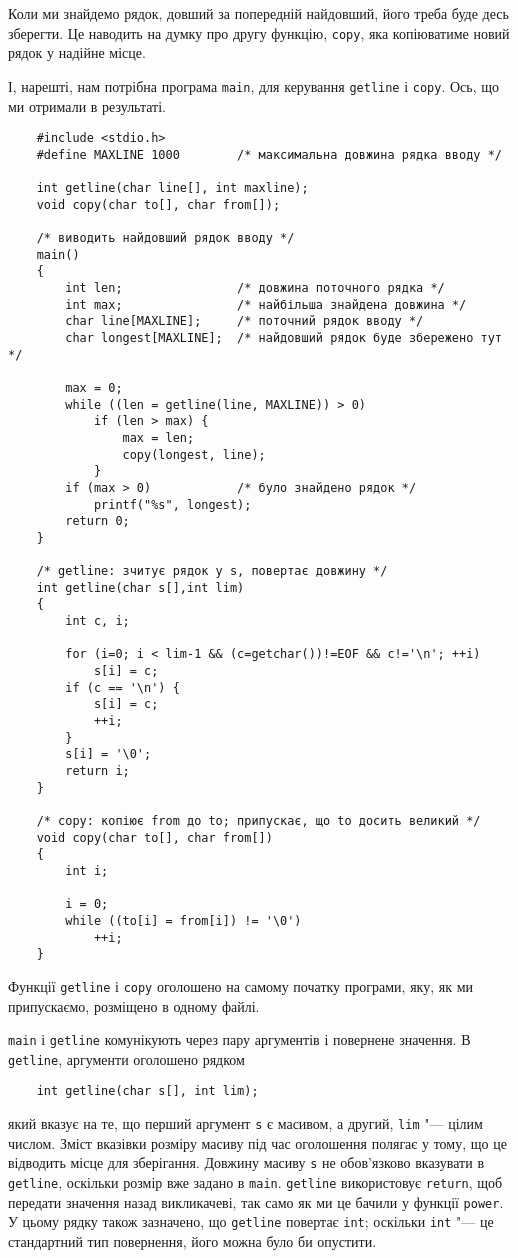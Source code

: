 \documentclass[a4paper,12pt]{book}
\begin{document}
  Коли ми знайдемо рядок, довший за попередній найдовший, його треба буде десь зберегти.
  Це наводить на думку про другу функцію, \texttt{copy}, яка копіюватиме новий рядок у
  надійне місце.

  І, нарешті, нам потрібна програма \texttt{main}, для керування \texttt{getline} і
  \texttt{copy}. Ось, що ми отримали в результаті.

  \begin{verbatim}
    #include <stdio.h>
    #define MAXLINE 1000        /* максимальна довжина рядка вводу */

    int getline(char line[], int maxline);
    void copy(char to[], char from[]);

    /* виводить найдовший рядок вводу */
    main()
    {
        int len;                /* довжина поточного рядка */
        int max;                /* найбільша знайдена довжина */
        char line[MAXLINE];     /* поточний рядок вводу */
        char longest[MAXLINE];  /* найдовший рядок буде збережено тут */

        max = 0;
        while ((len = getline(line, MAXLINE)) > 0)
            if (len > max) {
                max = len;
                copy(longest, line);
            }
        if (max > 0)            /* було знайдено рядок */
            printf("%s", longest);
        return 0;
    }

    /* getline: зчитує рядок у s, повертає довжину */
    int getline(char s[],int lim)
    {
        int c, i;

        for (i=0; i < lim-1 && (c=getchar())!=EOF && c!='\n'; ++i)
            s[i] = c;
        if (c == '\n') {
            s[i] = c;
            ++i;
        }
        s[i] = '\0';
        return i;
    }

    /* copy: копіює from до to; припускає, що to досить великий */
    void copy(char to[], char from[])
    {
        int i;

        i = 0;
        while ((to[i] = from[i]) != '\0')
            ++i;
    }
  \end{verbatim}

  Функції \texttt{getline} і \texttt{copy} оголошено на самому початку програми, яку, як
  ми припускаємо, розміщено в одному файлі.

  \texttt{main} і \texttt{getline} комунікують через пару аргументів і повернене значення.
  В \texttt{getline}, аргументи оголошено рядком
  \begin{verbatim}
    int getline(char s[], int lim);
  \end{verbatim}
  який вказує на те, що перший аргумент \texttt{s} є масивом, а другий, \texttt{lim}
  "--- цілим числом. Зміст вказівки розміру масиву під час оголошення полягає у тому,
  що це відводить місце для зберігання. Довжину масиву \texttt{s} не обов'язково вказувати
  в \texttt{getline}, оскільки розмір вже задано в \texttt{main}. \texttt{getline}
  використовує \texttt{return}, щоб передати значення назад викликачеві, так само як ми це
  бачили у функції \texttt{power}. У цьому рядку також зазначено, що \texttt{getline}
  повертає \texttt{int}; оскільки \texttt{int} "--- це стандартний тип повернення, його
  можна було би опустити.
\end{document}
